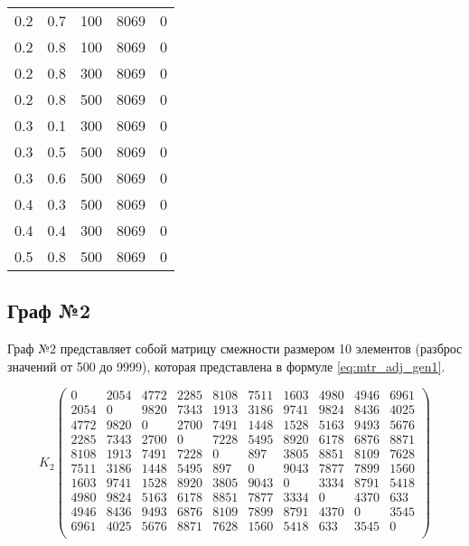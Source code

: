\begin{table}[ht]
\begin{center}
\begin{threeparttable}
\begin{tabular}{|c|c|c|c|c|}
				0.2 &  0.7 &  100 &  8069 &     0 \\
				0.2 &  0.8 &  100 &  8069 &     0 \\
				0.2 &  0.8 &  300 &  8069 &     0 \\
				0.2 &  0.8 &  500 &  8069 &     0 \\ \hline
				0.3 &  0.1 &  300 &  8069 &     0 \\
				0.3 &  0.5 &  500 &  8069 &     0 \\
				0.3 &  0.6 &  500 &  8069 &     0 \\ \hline
				0.4 &  0.3 &  500 &  8069 &     0 \\
				0.4 &  0.4 &  300 &  8069 &     0 \\ \hline
				0.5 &  0.8 &  500 &  8069 &     0 \\ \hline
			\end{tabular}	
		\end{threeparttable}
	\end{center}
\end{table}

\clearpage

\subsection{Граф №2}

Граф №2 представляет собой матрицу смежности размером 10 элементов (разброс значений от 500 до 9999), которая представлена в формуле \ref{eq:mtr_adj_gen1}.

\begin{equation}
	\label{eq:mtr_adj_gen1}
	K_2  
	\begin{pmatrix}
		0  & 2054 & 4772 & 2285 & 8108 & 7511 & 1603 & 4980 &  4946 & 6961 \\
		2054 &  0 & 9820 & 7343 & 1913 & 3186 & 9741 & 9824 & 8436 & 4025 \\
		4772 & 9820 & 0 & 2700 & 7491 & 1448 & 1528 & 5163 & 9493 & 5676 \\
		2285 & 7343 & 2700 & 0 & 7228 & 5495 & 8920 & 6178 & 6876 & 8871 \\
		8108 & 1913 & 7491 & 7228 & 0 & 897 & 3805 & 8851 & 8109 & 7628 \\
		7511 & 3186 & 1448 & 5495 & 897 & 0 & 9043 & 7877 & 7899 & 1560 \\
		1603 & 9741 & 1528 & 8920 & 3805 & 9043 & 0 & 3334 & 8791 & 5418 \\
		4980 & 9824 & 5163 & 6178 & 8851 & 7877 & 3334 & 0 & 4370 & 633 \\
		4946 & 8436 & 9493 & 6876 & 8109 & 7899 & 8791 & 4370 & 0 & 3545 \\
		6961 & 4025 & 5676 & 8871 & 7628 & 1560 & 5418 & 633 & 3545 & 0 \\
	\end{pmatrix}
\end{equation}

